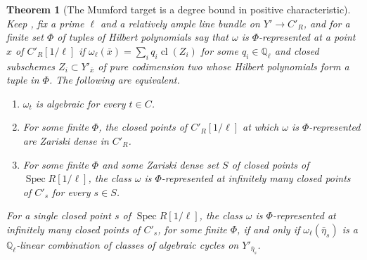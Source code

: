 \documentclass[11pt,reqno]{amsart}
\theoremstyle{plain}
\newtheorem{theorem}{Theorem}[section]
\theoremstyle{definition}
\theoremstyle{remark}
\newcommand{\QQ}{\mathbb{Q}}
\DeclareMathOperator{\Spec}{Spec}
\begin{document}
\begin{theorem}[The Mumford target is a degree bound in positive
characteristic]\label{thm:modpdensity}
Keep , fix a prime $\ell$ and a relatively ample line bundle
on $Y'\to C'_{R}$, and for a finite set $\Phi$ of tuples of Hilbert
polynomials say that $\omega$ is \emph{$\Phi$-represented} at a point $x$ of
$C'_{R}[1/\ell]$ if $\omega_{\ell}(\bar{x})=\sum_{i}q_{i}\operatorname{cl}(Z_{i})$
for some $q_{i}\in\QQ_{\ell}$ and closed subschemes $Z_{i}\subset Y'_{\bar{x}}$
of pure codimension two whose Hilbert polynomials form a tuple in $\Phi$. The
following are equivalent.
\begin{enumerate}[label=\textup{(\alph*)},leftmargin=2.6em,itemsep=2pt]
\item $\omega_{t}$ is algebraic for every $t\in C$.
\item For some finite $\Phi$, the closed points of $C'_{R}[1/\ell]$ at which
  $\omega$ is $\Phi$-represented are Zariski dense in $C'_{R}$.
\item For some finite $\Phi$ and some Zariski dense set $S$ of closed points of
  $\Spec R[1/\ell]$, the class $\omega$ is $\Phi$-represented at infinitely
  many closed points of $C'_{s}$ for every $s\in S$.
\end{enumerate}
For a single closed point $s$ of $\Spec R[1/\ell]$, the class $\omega$ is
$\Phi$-represented at infinitely many closed points of $C'_{s}$, for some
finite $\Phi$, if and only if $\omega_{\ell}(\bar\eta_{s})$ is a
$\QQ_{\ell}$-linear combination of classes of algebraic cycles on
$Y'_{\bar\eta_{s}}$.
\end{theorem}
\end{document}
